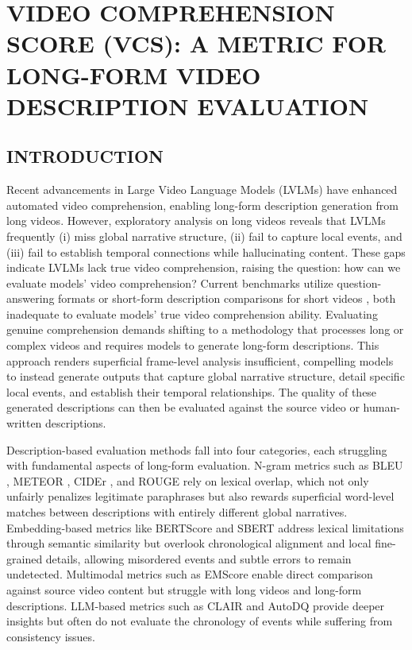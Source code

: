 \documentclass[main.tex]{subfiles}
\begin{document}
\section{VIDEO COMPREHENSION SCORE (VCS): A METRIC FOR LONG-FORM VIDEO DESCRIPTION EVALUATION}

\subsection{INTRODUCTION}

Recent advancements in Large Video Language Models (LVLMs) \cite{Yuan2025Tarsier2,Shen2025LongVU,Ataallah2024Goldfish,Chen2025LongVILA} have enhanced automated video comprehension, enabling long-form description generation from long videos. However, exploratory analysis on long videos reveals that LVLMs frequently (i) miss global narrative structure, (ii) fail to capture local events, and (iii) fail to establish temporal connections while hallucinating content. These gaps indicate LVLMs lack true video comprehension, raising the question: how can we evaluate models' video comprehension? Current benchmarks utilize question-answering formats \cite{wu2024longvideobench,ataallah2024infinibench,nagrani2025neptune} or short-form description comparisons for short videos \cite{wyzs:24,chen:acl11,ZhXuCoAAAI18}, both inadequate to evaluate models' true video comprehension ability. Evaluating genuine comprehension demands shifting to a methodology that processes long or complex videos and requires models to generate long-form descriptions. This approach renders superficial frame-level analysis insufficient, compelling models to instead generate outputs that capture global narrative structure, detail specific local events, and establish their temporal relationships. The quality of these generated descriptions can then be evaluated against the source video or human-written descriptions.

Description-based evaluation methods fall into four categories, each struggling with fundamental aspects of long-form evaluation. N-gram metrics such as BLEU \cite{p:02}, METEOR \cite{bl:05}, CIDEr \cite{v:15}, and ROUGE \cite{l:04} rely on lexical overlap, which not only unfairly penalizes legitimate paraphrases but also rewards superficial word-level matches between descriptions with entirely different global narratives. Embedding-based metrics like BERTScore \cite{z:20} and SBERT \cite{r:19} address lexical limitations through semantic similarity but overlook chronological alignment and local fine-grained details, allowing misordered events and subtle errors to remain undetected. Multimodal metrics such as EMScore \cite{syxl:22} enable direct comparison against source video content but struggle with long videos and long-form descriptions. LLM-based metrics such as CLAIR \cite{chan:23} and AutoDQ \cite{wyzs:24} provide deeper insights but often do not evaluate the chronology of events while suffering from consistency issues.
\end{document}
